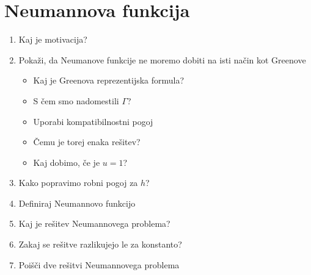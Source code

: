 \documentclass{article}
\begin{document}
    \section{Neumannova funkcija}
    \begin{enumerate}
        \item Kaj je motivacija?
        \item Pokaži, da Neumanove funkcije ne moremo dobiti na isti način kot Greenove
        \begin{itemize}
            \item Kaj je Greenova reprezentijska formula?
            \item S čem smo nadomestili $\Gamma$?
            \item Uporabi kompatibilnostni pogoj
            \item Čemu je torej enaka rešitev?
            \item Kaj dobimo, če je $u = 1$?
        \end{itemize}
        \item Kako popravimo robni pogoj za $h$?
        \item Definiraj Neumannovo funkcijo
        \item Kaj je rešitev Neumannovega problema?
        \item Zakaj se rešitve razlikujejo le za konstanto?
        \item Poišči dve rešitvi Neumannovega problema
    \end{enumerate}
\end{document}
